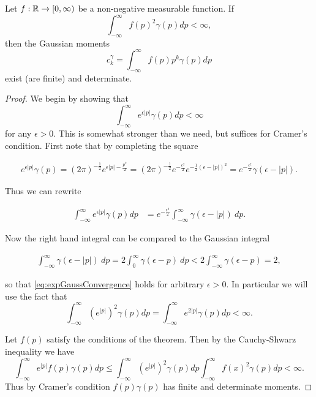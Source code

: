 \begin{theorem}

  Let $f : \mathbb{R} \to [0, \infty)$ be a non-negative measurable function. If 
  \[
    \int_{-\infty}^\infty f(p)^2 \gamma(p) dp < \infty,
  \]
  then the Gaussian moments
  \[
    c^\gamma_k = \int_{-\infty}^\infty f(p) p^k \gamma(p) dp
  \]
  exist (are finite) and determinate.

\end{theorem}

\begin{proof}

  We begin by showing that
  \begin{equation} \label{eq:expGaussConvergence}
    \int_{-\infty}^\infty e^{\epsilon |p|} \gamma(p) dp < \infty
  \end{equation}
  for any $\epsilon > 0$. This is somewhat stronger than we need, but suffices for Cramer's condition. First note that by completing the square

  \begin{align*}
    e^{\epsilon |p|} \gamma(p) = (2\pi)^{-\frac12} e^{\epsilon |p| - \frac{p^2}2} =  (2\pi)^{-\frac12} e^{-\frac{\epsilon^2}2} e^{-\frac12 (\epsilon - |p|)^2} = e^{-\frac{\epsilon^2}2} \gamma(\epsilon - |p|).
  \end{align*}

  Thus we can rewrite

  \begin{align*}
    \int_{-\infty}^\infty e^{\epsilon |p|} \gamma(p) dp 
    &= e^{-\frac{\epsilon^2}2} \int_{-\infty}^\infty \gamma(\epsilon - |p|) ~dp.
  \end{align*}

  Now the right hand integral can be compared to the Gaussian integral
  
  \begin{align*}
    \int_{-\infty}^\infty \gamma(\epsilon - |p|) ~dp
    = 2 \int_0^\infty \gamma(\epsilon - p) ~dp < 2 \int_{-\infty}^\infty \gamma(\epsilon - p) = 2,
  \end{align*}
  
  so that \ref{eq:expGaussConvergence} holds for arbitrary $\epsilon > 0$. In particular we will use the fact that
  \[
    \int_{-\infty}^\infty (e^{|p|})^2 \gamma(p) dp = \int_{-\infty}^\infty e^{2|p|} \gamma(p) dp < \infty.
  \]

  Let $f(p)$ satisfy the conditions of the theorem. Then by the Cauchy-Shwarz inequality we have
  \[
    \int_{-\infty}^\infty e^{|p|} f(p) \gamma(p) dp \leq \int_{-\infty}^\infty (e^{|p|})^2 \gamma(p) dp \int_{-\infty}^\infty f(x)^2 \gamma(p) dp < \infty.
  \]
  Thus by Cramer's condition $f(p) \gamma(p)$ has finite and determinate moments.
\end{proof}


